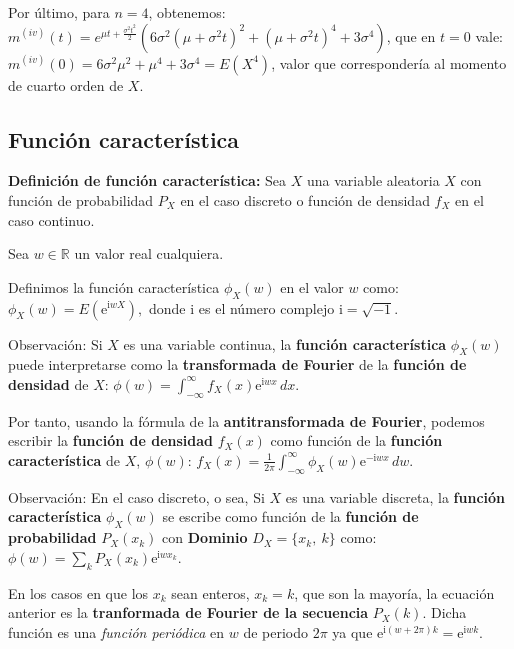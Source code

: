 \documentclass[]{book}
\begin{document}
Por último, para \(n=4\), obtenemos:
\(m^{(iv)}(t)=e^{\mu t+\frac{\sigma ^2 t^2}{2}}  \left(6 \sigma ^2 \left(\mu  +\sigma ^2 t\right)^2+\left(\mu  +\sigma ^2 t\right)^4+3 \sigma  ^4\right)\), que en \(t=0\) vale: \(m^{(iv)}(0)=6\sigma^2\mu^2+\mu^4+3\sigma^4=E\left(X^4\right)\), valor que correspondería al momento de cuarto orden de \(X\).

\hypertarget{funciuxf3n-caracteruxedstica}{%
\subsection{Función característica}\label{funciuxf3n-caracteruxedstica}}

\textbf{Definición de función característica:}
Sea \(X\) una variable aleatoria \(X\) con función de probabilidad \(P_X\) en el caso discreto o función
de densidad \(f_X\) en el caso continuo.

Sea \(w\in\mathbb{R}\) un valor real cualquiera.

Definimos la función característica \(\phi_X(w)\) en el valor \(w\) como: \(\phi_X(w)=E\left(\mathrm{e}^{\mathrm{i} w X}\right),\) donde \(\mathrm{i}\) es el número complejo \(\mathrm{i}=\sqrt{-1}\).

Observación:
Si \(X\) es una variable continua, la \textbf{función característica} \(\phi_X(w)\) puede interpretarse como la \textbf{transformada de Fourier} de la \textbf{función de densidad} de \(X\):
\(\phi(w)=\int_{-\infty}^\infty f_X(x)\mathrm{e}^{\mathrm{i}w x}\, dx.\)

Por tanto, usando la fórmula de la \textbf{antitransformada de Fourier}, podemos escribir la \textbf{función de densidad} \(f_X(x)\) como función de la \textbf{función característica} de \(X\), \(\phi(w)\):
\(f_X(x)=\frac{1}{2\pi}\int_{-\infty}^\infty \phi_X(w)\mathrm{e}^{-\mathrm{i}w x}\, dw.\)

Observación:
En el caso discreto, o sea, Si \(X\) es una variable discreta, la \textbf{función característica} \(\phi_X(w)\) se escribe como función de la \textbf{función de probabilidad} \(P_X(x_k)\) con \textbf{Dominio} \(D_X=\{x_k,\ k\}\) como:
\(\phi(w)=\sum_{k} P_X(x_k)\mathrm{e}^{\mathrm{i}w x_k}.\)

En los casos en que los \(x_k\) sean enteros, \(x_k=k\), que son la mayoría, la ecuación anterior es la \textbf{tranformada de Fourier de la secuencia} \(P_X(k)\). Dicha función es una \emph{función periódica} en \(w\) de periodo \(2\pi\) ya que \(\mathrm{e}^{\mathrm{i}(w+2\pi)k}=\mathrm{e}^{\mathrm{i}wk}.\)
\end{document}
